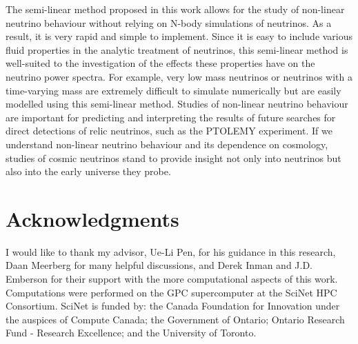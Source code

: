 \documentclass{aastex}
\newcommand{\ptolemy}{PTOLEMY }
\begin{document}
The semi-linear method proposed in this work allows for the study of
non-linear neutrino behaviour without relying on
N-body simulations of neutrinos.  As a result, it is very rapid and simple to
implement.
Since it is easy to include various fluid properties in 
the analytic treatment of neutrinos, 
this semi-linear method is well-suited to the investigation of
the effects these properties have on the neutrino power spectra. 
For example, very low mass neutrinos or neutrinos with a time-varying
mass are extremely difficult to simulate numerically but are easily
modelled using this semi-linear method.
Studies of
non-linear neutrino behaviour are important for predicting and
interpreting the results of future searches for 
direct detections of relic neutrinos, such as the
\ptolemy experiment.  If we understand non-linear neutrino behaviour
and its dependence on cosmology,
studies of cosmic neutrinos stand to provide insight not only into
neutrinos but also into the early universe they probe. 





\section*{ Acknowledgments }
I would like to thank my advisor, Ue-Li Pen, for his guidance in this
research, Daan Meerberg for many helpful discussions, and Derek Inman
and J.D. Emberson for their support with
the more computational aspects of this work.
Computations were performed on the GPC supercomputer at the SciNet HPC
Consortium.  SciNet is funded by: the Canada Foundation for
Innovation under the auspices of Compute Canada; the Government of
Ontario; Ontario Research Fund - Research Excellence; and the
University of Toronto.
\end{document}
